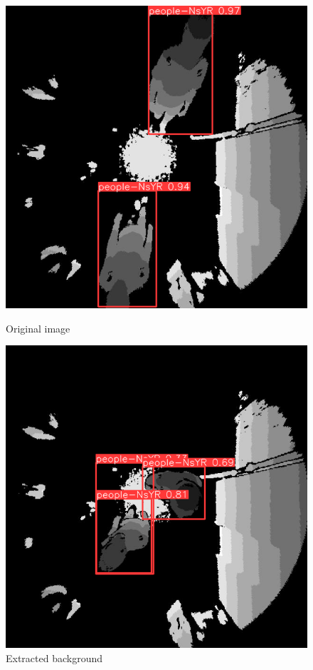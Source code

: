 \documentclass[conference]{IEEEtran}
\begin{document}
\begin{figure}[ht!]
    \centering
    \begin{minipage}[b]{0.22\textwidth}
        \centering
        \includegraphics[width=\textwidth]{Images/network/NetRes2.png}
        \caption{Original image}\label{fig:NetRes3}
    \end{minipage}
    \hfill
    \begin{minipage}[b]{0.22\textwidth}
        \centering
        \includegraphics[width=\textwidth]{Images/network/NetRes3.png}
        \caption{Extracted background}\label{fig:NetRes3}
    \end{minipage}
\end{figure}
\end{document}
